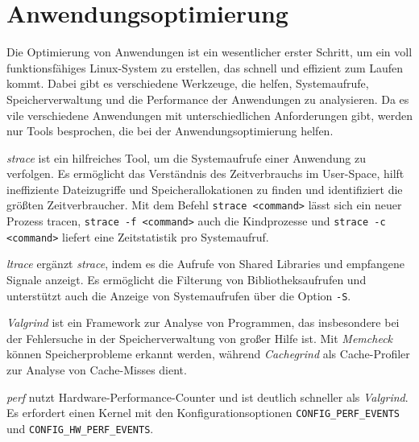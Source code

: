 
\section{Anwendungsoptimierung}
Die Optimierung von Anwendungen ist ein wesentlicher erster Schritt, um ein voll funktionsfähiges Linux-System zu erstellen, das schnell und effizient zum Laufen kommt. Dabei gibt es verschiedene Werkzeuge, die helfen, Systemaufrufe, Speicherverwaltung und die Performance der Anwendungen zu analysieren. Da es vile verschiedene Anwendungen mit unterschiedlichen Anforderungen gibt, werden nur Tools besprochen, die bei der Anwendungsoptimierung helfen.

\textit{strace} ist ein hilfreiches Tool, um die Systemaufrufe einer Anwendung zu verfolgen. Es ermöglicht das Verständnis des Zeitverbrauchs im User-Space, hilft ineffiziente Dateizugriffe und Speicherallokationen zu finden und identifiziert die größten Zeitverbraucher. Mit dem Befehl \texttt{strace <command>} lässt sich ein neuer Prozess tracen, \texttt{strace -f <command>} auch die Kindprozesse und \texttt{strace -c <command>} liefert eine Zeitstatistik pro Systemaufruf.

\textit{ltrace} ergänzt \textit{strace}, indem es die Aufrufe von Shared Libraries und empfangene Signale anzeigt. Es ermöglicht die Filterung von Bibliotheksaufrufen und unterstützt auch die Anzeige von Systemaufrufen über die Option \texttt{-S}.

\textit{Valgrind} ist ein Framework zur Analyse von Programmen, das insbesondere bei der Fehlersuche in der Speicherverwaltung von großer Hilfe ist. Mit \textit{Memcheck} können Speicherprobleme erkannt werden, während \textit{Cachegrind} als Cache-Profiler zur Analyse von Cache-Misses dient.

\textit{perf} nutzt Hardware-Performance-Counter und ist deutlich schneller als \textit{Valgrind}. Es erfordert einen Kernel mit den Konfigurationsoptionen \texttt{CONFIG\_PERF\_EVENTS} und \texttt{CONFIG\_HW\_PERF\_EVENTS}.

